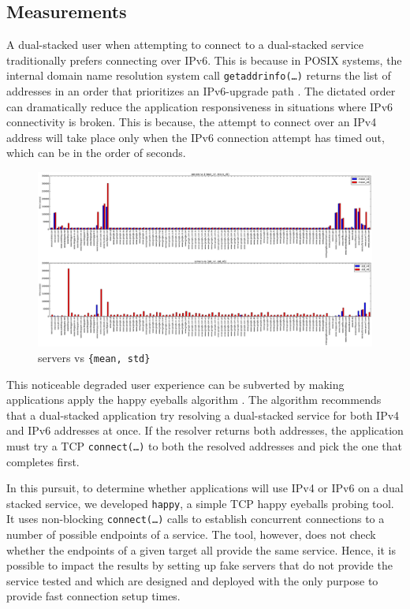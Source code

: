 \subsection{Measurements}

A dual-stacked user when attempting to connect to a dual-stacked service
traditionally prefers connecting over IPv6. This is because in POSIX systems,
the internal domain name resolution system call \texttt{getaddrinfo(\ldots)}
\cite{rfc3493} returns the list of addresses in an order that prioritizes an
IPv6-upgrade path \cite{rfc6724}. The dictated order can dramatically reduce
the application responsiveness in situations where IPv6 connectivity is
broken. This is because, the attempt to connect over an IPv4 address will take
place only when the IPv6 connection attempt has timed out, which can be in the
order of seconds.

\begin{figure}[t]
\centering
\includegraphics*[width=1.0\linewidth]{figures/happy-servers-mean-std}
\caption{servers vs \texttt{\{mean, std\}}}
\label{fig:happy-servers-mean-std}
\end{figure}

This noticeable degraded user experience can be subverted by making
applications apply the happy eyeballs algorithm \cite{rfc6555}. The algorithm
recommends that a dual-stacked application try resolving a dual-stacked
service for both IPv4 and IPv6 addresses at once. If the resolver returns both
addresses, the application must try a TCP \texttt{connect(\ldots)} to both the
resolved addresses and pick the one that completes first.

In this pursuit, to determine whether applications will use IPv4 or IPv6 on a
dual stacked service, we developed \texttt{happy}, a simple TCP happy eyeballs
probing tool. It uses non-blocking \texttt{connect(\ldots)} calls to establish
concurrent connections to a number of possible endpoints of a service. The
tool, however, does not check whether the endpoints of a given target all
provide the same service. Hence, it is possible to impact the results by
setting up fake servers that do not provide the service tested and which are
designed and deployed with the only purpose to provide fast connection setup
times.

